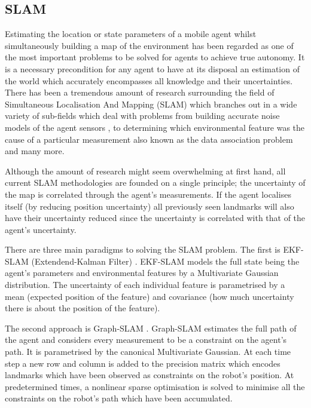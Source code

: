 \subsection{SLAM}

Estimating the location or state parameters of a mobile agent whilst simultaneously building a map of the environment has been
regarded as one of the most important problems to be solved for agents to achieve true autonomy. It is a necessary precondition for 
any agent to have at its disposal an estimation of the world which accurately encompasses all knowledge and their uncertainties. There has 
been a tremendous amount of research surrounding the field of Simultaneous Localisation And Mapping (SLAM) which branches out in a wide variety of sub-fields 
which deal with problems from building accurate noise models of the agent sensors \cite{Plagemann07gaussianbeam}, to determining which environmental 
feature was the cause of a particular measurement also known as the data association problem \cite{DataAssociation2003} and many more. 


Although the amount of research might seem overwhelming at first hand, all current SLAM methodologies are founded on a single principle; 
the uncertainty of the map is correlated through the agent's measurements. If the agent localises itself (by reducing position uncertainty)
all previously seen landmarks will also have their uncertainty reduced since the uncertainty is correlated with that of the agent's uncertainty.


There are three main paradigms to solving the SLAM problem. The first is EKF-SLAM (Extendend-Kalman Filter) \cite{SLAM_part1}.
EKF-SLAM models the full state being the agent's parameters and environmental features by a Multivariate Gaussian distribution. 
The uncertainty of each individual feature is parametrised by a mean (expected position of the feature) and covariance 
(how much uncertainty there is about the position of the feature).

The second approach is Graph-SLAM \cite{TutGraphSLAM}. Graph-SLAM estimates the full path of the agent and considers every measurement to 
be a constraint on the agent's path. It is parametrised by the canonical Multivariate Gaussian. At each time step a new row and column 
is added to the precision matrix which encodes landmarks which have been observed as constraints on the robot's position.
At predetermined times, a nonlinear sparse optimisation is solved to minimise all the constraints on the robot's path which have been accumulated.

